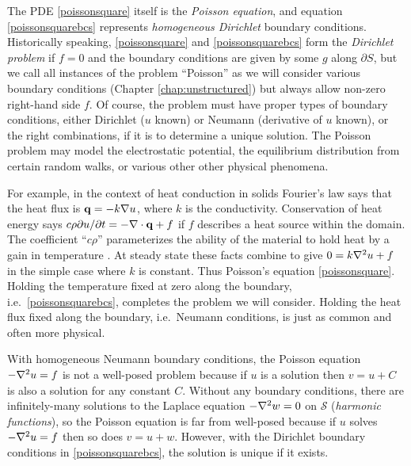 The PDE \eqref{poissonsquare} itself is the \emph{Poisson equation}, and equation \eqref{poissonsquarebcs} represents \emph{homogeneous Dirichlet} boundary conditions.  Historically speaking, \eqref{poissonsquare} and \eqref{poissonsquarebcs} form the \emph{Dirichlet problem} if $f=0$ and the boundary conditions are given by some $g$ along $\partial S$, but we call all instances of the problem ``Poisson'' as we will consider various boundary conditions (Chapter \ref{chap:unstructured}) but always allow non-zero right-hand side $f$.  Of course, the problem must have proper types of boundary conditions, either Dirichlet ($u$ known) or Neumann (derivative of $u$ known), or the right combinations, if it is to determine a unique solution.  The Poisson problem may model the electrostatic potential, the equilibrium distribution from certain random walks, or various other other physical phenomena.

For example, in the context of heat conduction in solids Fourier's law says that the heat flux is $\mathbf{q} = -k \nabla u$, where $k$ is the conductivity.  Conservation of heat energy says $c\rho \partial u/\partial t = - \nabla\cdot\mathbf{q} + f$ if $f$ describes a heat source within the domain.  The coefficient ``$c\rho$'' parameterizes the ability of the material to hold heat by a gain in temperature \citep{Ockendonetal2003}.  At steady state these facts combine to give $0 = k \nabla^2 u + f$ in the simple case where $k$ is constant.  Thus Poisson's equation \eqref{poissonsquare}.  Holding the temperature fixed at zero along the boundary, i.e.~\eqref{poissonsquarebcs}, completes the problem we will consider.  Holding the heat flux fixed along the boundary, i.e.~Neumann conditions, is just as common and often more physical.

With homogeneous Neumann boundary conditions, the Poisson equation $-\nabla^2 u = f$ is not a well-posed problem because if $u$ is a solution then $v=u+C$ is also a solution for any constant $C$.  Without any boundary conditions, there are infinitely-many solutions to the Laplace equation $-\nabla^2 w = 0$ on $\mathcal{S}$ (\emph{harmonic functions}), so the Poisson equation is far from well-posed because if $u$ solves $-\nabla^2 u = f$ then so does $v=u+w$.  However, with the Dirichlet boundary conditions in \eqref{poissonsquarebcs}, the solution is unique if it exists.

